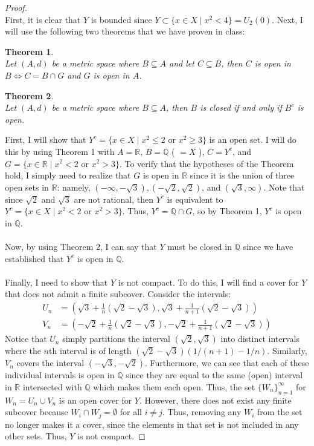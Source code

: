 \documentclass[10pt,a4paper]{article}
\newtheorem{theorem}{Theorem}
\theoremstyle{definition}
\theoremstyle{definition}
\begin{document}
\begin{proof}$ $
\\First, it is clear that $Y$ is bounded since $Y \subset \{x \in X \; | \; x^2 < 4 \} = U_2(0)$. Next, I will use the following two theorems that we have proven in class:

\begin{theorem}$ $
\\Let $(A, d)$ be a metric space where $B \subseteq A$ and let $C \subseteq B$, then $C$ is open in $B \iff C = B \cap G$ and $G$ is open in $A$. 
\end{theorem}

\begin{theorem}$ $
\\Let $(A, d)$ be a metric space where $B \subseteq A$, then $B$ is closed if and only if $B^c$ is open. 
\end{theorem}
$ $
\\First, I will show that $Y^c = \{x \in X \; | \; x^2 \leq 2 \text{ or } x^2 \geq 3\}$ is an open set. I will do this by using Theorem 1 with $A = \mathbb{R}$, $B = \mathbb{Q}$ ( $= X$ ), $C = Y^c$, and $G = \{x \in \mathbb{R} \; | \; x^2 < 2 \text{ or } x^2 > 3\}$. To verify that the hypotheses of the Theorem hold, I simply need to realize that $G$ is open in $\mathbb{R}$ since it is the union of three open sets in $\mathbb{R}$: namely, $(-\infty, -\sqrt{3}), (-\sqrt{2}, \sqrt{2})$, and $(\sqrt{3}, \infty)$. Note that since $\sqrt{2}$ and $\sqrt{3}$ are not rational, then $Y^c$ is equivalent to $Y^c = \{x \in X \; | \; x^2 < 2 \text{ or } x^2 > 3\}$. Thus, $Y^c = \mathbb{Q} \cap G$, so by Theorem 1, $Y^c$ is open in $\mathbb{Q}$. 
\\
\\Now, by using Theorem 2, I can say that $Y$ must be closed in $\mathbb{Q}$ since we have established that $Y^c$ is open in $\mathbb{Q}$. 
\\
\\Finally, I need to show that $Y$ is not compact. To do this, I will find a cover for $Y$ that does not admit a finite subcover. Consider the intervals:
\begin{align*}
U_n &= \left(\sqrt{3} + \frac{1}{n}(\sqrt{2} - \sqrt{3}), \sqrt{3} + \frac{1}{n+1}(\sqrt{2} - \sqrt{3})\right)\\
V_n &= \left(-\sqrt{2} + \frac{1}{n}(\sqrt{2} - \sqrt{3}), -\sqrt{2} + \frac{1}{n+1}(\sqrt{2} - \sqrt{3})\right)
\end{align*}
Notice that $U_n$ simply partitions the interval $(\sqrt{2}, \sqrt{3})$ into distinct intervals where the $n$th interval is of length $(\sqrt{2} - \sqrt{3})(1/(n+1) - 1/n)$. Similarly, $V_n$ covers the interval $(-\sqrt{3}, -\sqrt{2})$. Furthermore, we can see that each of these individual intervals is open in $\mathbb{Q}$ since they are equal to the same (open) interval in $\mathbb{R}$ intersected with $\mathbb{Q}$ which makes them each open. Thus, the set $\{W_n\}_{n = 1}^\infty$ for $W_n = U_n \cup V_n$ is an open cover for $Y$. However, there does not exist any finite subcover because $W_i \cap W_j = \emptyset$ for all $i \neq j$. Thus, removing any $W_i$ from the set no longer makes it a cover, since the elements in that set is not included in any other sets. Thus, $Y$ is not compact. 
\end{proof}
\end{document}
